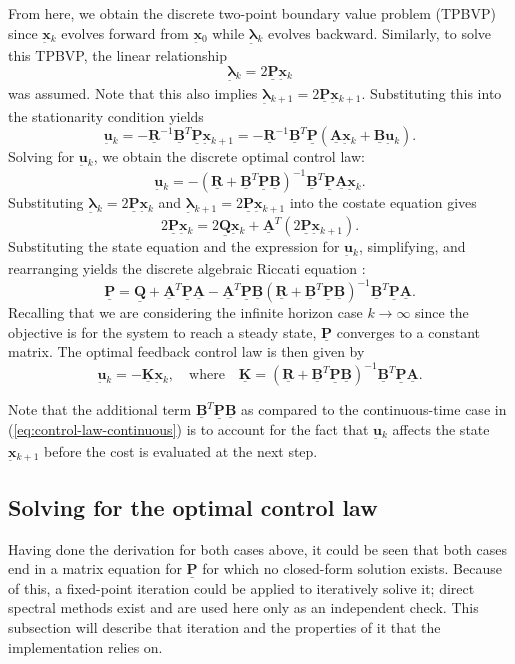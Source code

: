 \documentclass[12pt]{article}
\newcommand{\vb}[1]{{\underset{\tilde{}}{\mathbf{#1}}}}
\newcommand{\mb}[1]{\underline{\mathbf{#1}}}
\begin{document}
From here, we obtain the discrete two-point boundary value problem (TPBVP) since \(\vb{x}{}_k\) evolves forward from \(\vb{x}{}_0\) while \(\vb{\boldsymbol{\lambda}}{}_k\) evolves backward. Similarly, to solve this TPBVP, the linear relationship 
\[
\vb{\boldsymbol{\lambda}}{}_k = 2 \mb{P}\vb{x}{}_k
\]
was assumed. Note that this also implies \(\vb{\boldsymbol{\lambda}}{}_{k+1} = 2 \mb{P}\vb{x}{}_{k+1}\). Substituting this into the stationarity condition yields
\[
\vb{u}{}_k = -\mb{R}^{-1}\mb{B}^T\mb{P}\vb{x}{}_{k+1} = -\mb{R}^{-1}\mb{B}^T\mb{P}(\mb{A}\vb{x}{}_k + \mb{B}\vb{u}{}_k).
\]
Solving for \(\vb{u}{}_k\), we obtain the discrete optimal control law:
\[
\vb{u}{}_k = -(\mb{R} + \mb{B}^T\mb{P}\mb{B})^{-1}\mb{B}^T\mb{P}\mb{A}\vb{x}{}_k.
\]
Substituting \(\vb{\boldsymbol{\lambda}}{}_k = 2 \mb{P}\vb{x}{}_k\) and \(\vb{\boldsymbol{\lambda}}{}_{k+1} = 2 \mb{P}\vb{x}{}_{k+1}\) into the costate equation gives
\[
2\mb{P}\vb{x}{}_k = 2\mb{Q}\vb{x}{}_k + \mb{A}^T (2\mb{P}\vb{x}{}_{k+1}).
\]
Substituting the state equation and the expression for \(\vb{u}{}_k\), simplifying, and rearranging yields the discrete algebraic Riccati equation \cite{CainesMayne1970,Molinari1975}:
\begin{equation}
\mb{P} = \mb{Q} + \mb{A}^T \mb{P} \mb{A} - \mb{A}^T \mb{P} \mb{B} (\mb{R} + \mb{B}^T \mb{P} \mb{B})^{-1} \mb{B}^T \mb{P} \mb{A}.
\label{eq:riccati-discrete}
\end{equation}
Recalling that we are considering the infinite horizon case \(k \to \infty\) since the objective is for the system to reach a steady state, \(\mb{P}\) converges to a constant matrix. The optimal feedback control law is then given by
\begin{equation}
    \vb{u}{}_k = -\mb{K}\vb{x}{}_k, \quad \text{where} \quad \mb{K} = (\mb{R} + \mb{B}^T\mb{P}\mb{B})^{-1}\mb{B}^T\mb{P}\mb{A}.
    \label{eq:control-law-discrete}
\end{equation}

Note that the additional term $\mb{B}^T\mb{P}\mb{B}$ as compared to the continuous-time case in (\ref{eq:control-law-continuous}) is to account for the fact that $\vb{u}{}_k$ affects the state $\vb{x}{}_{k+1}$ before the cost is evaluated at the next step.

\subsection{Solving for the optimal control law}
\label{sec:solving}

Having done the derivation for both cases above, it could be seen that both cases end in a matrix equation for $\mb{P}$ for which no closed-form solution exists. Because of this, a fixed-point iteration \cite{Kleinman1968} could be applied to iteratively solive it; direct spectral methods exist \cite{Laub1979} and are used here only as an independent check. This subsection will describe that iteration and the properties of it that the implementation relies on.
\end{document}
